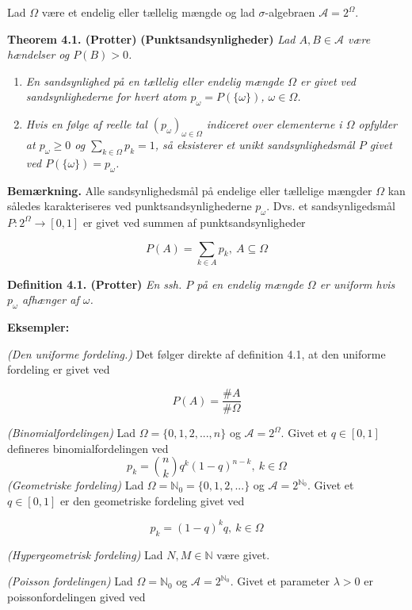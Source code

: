 \documentclass[
]{book}
\providecommand{\tightlist}{%
  \setlength{\itemsep}{0pt}\setlength{\parskip}{0pt}}
\begin{document}
Lad \(\Omega\) være et endelig eller tællelig mængde og lad \(\sigma\)-algebraen \(\mathcal{A}=2^\Omega\).

\textbf{Theorem 4.1. (Protter)} \textbf{(Punktsandsynligheder)} \emph{Lad \(A,B\in\mathcal{A}\) være hændelser og \(P(B)>0\).}

\begin{enumerate}
\def\labelenumi{\alph{enumi}.}
\tightlist
\item
  \emph{En sandsynlighed på en tællelig eller endelig mængde \(\Omega\) er givet ved sandsynlighederne for hvert atom \(p_\omega=P(\{\omega\})\), \(\omega\in\Omega\).}
\item
  \emph{Hvis en følge af reelle tal \((p_\omega)_{\omega\in\Omega}\) indiceret over elementerne i \(\Omega\) opfylder at \(p_\omega\ge0\) og \(\sum_{k\in\Omega}p_k=1\), så eksisterer et unikt sandsynlighedsmål \(P\) givet ved \(P(\{\omega\})=p_\omega\).}
\end{enumerate}

\textbf{Bemærkning.} Alle sandsynlighedsmål på endelige eller tællelige mængder \(\Omega\) kan således karakteriseres ved punktsandsynlighederne \(p_\omega\). Dvs. et sandsynligedsmål \(P : 2^\Omega \to [0,1]\) er givet ved summen af punktsandsynligheder

\[
P(A)=\sum_{k\in A}p_k,\ A\subseteq\Omega
\]

\textbf{Definition 4.1. (Protter)} \emph{En ssh. \(P\) på en endelig mængde \(\Omega\) er uniform hvis \(p_\omega\) afhænger af \(\omega\).}

\textbf{Eksempler:}

\emph{(Den uniforme fordeling.)} Det følger direkte af definition 4.1, at den uniforme fordeling er givet ved

\[
P(A)=\frac{\#A}{\#\Omega}
\]

\emph{(Binomialfordelingen)} Lad \(\Omega=\{0,1,2,...,n\}\) og \(\mathcal{A}=2^\Omega\). Givet et \(q\in[0,1]\) defineres binomialfordelingen ved
\[
p_k={n\choose k}q^k(1-q)^{n-k},\ k\in\Omega
\]
\emph{(Geometriske fordeling)} Lad \(\Omega=\mathbb{N}_0=\{0,1,2,...\}\) og \(\mathcal{A}=2^{\mathbb{N}_0}\). Givet et \(q\in[0,1]\) er den geometriske fordeling givet ved

\[
p_k=(1-q)^kq,\ k\in\Omega
\]

\emph{(Hypergeometrisk fordeling)} Lad \(N,M\in\mathbb{N}\) være givet.

\emph{(Poisson fordelingen)} Lad \(\Omega=\mathbb{N}_0\) og \(\mathcal{A}=2^{\mathbb{N}_0}\). Givet et parameter \(\lambda>0\) er poissonfordelingen gived ved
\end{document}
